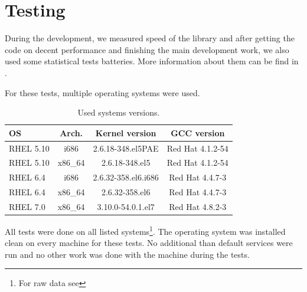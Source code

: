 \chapter{Testing} \label{chap:testing}

During the development, we measured speed of the library and after getting the code on decent performance and finishing the main development work, we also used some statistical tests batteries. More information about them can be find in .

For these tests, multiple operating systems were used.
\begin{table}[h!]
  \begin{center}
    \begin{tabular}{|l|c|c|c|}
      \hline
      OS & Arch. & Kernel version & GCC version\\
      \hline
      \hline
      RHEL 5.10 & i686 & 2.6.18-348.el5PAE & Red Hat 4.1.2-54\\
      \hline
      RHEL 5.10 & x86\_64 & 2.6.18-348.el5 & Red Hat 4.1.2-54\\
      \hline
      RHEL 6.4 & i686 & 2.6.32-358.el6.i686 & Red Hat 4.4.7-3\\
      \hline
      RHEL 6.4 & x86\_64 & 2.6.32-358.el6 & Red Hat 4.4.7-3\\
      \hline
      RHEL 7.0 & x86\_64 & 3.10.0-54.0.1.el7 & Red Hat 4.8.2-3\\
      \hline
    \end{tabular}
    \caption{Used systems versions.}
    \label{tab:testing:systems}
  \end{center}
\end{table}

All tests were done on all listed systems\footnote{For raw data see }. The operating system was installed clean on every machine for these tests. No additional than default services were run and no other work was done with the machine during the tests.



